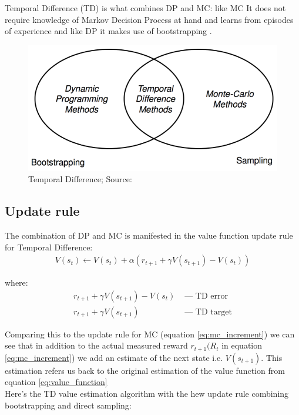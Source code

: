Temporal Difference (TD) is what combines DP and MC: like MC It does not require knowledge of Markov Decision Process at hand and 
learns from episodes of experience and like DP it makes use of bootstrapping \cite{lecture_mfl}.

\begin{figure}[h!]
  \centering
  \includegraphics[scale=0.5]{figures/TD_diagrams.PNG}
  \caption{Temporal Difference; Source: \cite{lecture_mfl}}
  \label{fig:td}
\end{figure}

\subsection{Update rule}
The combination of DP and MC is manifested in the value function update rule for Temporal Difference:
\begin{align}
  V(s_t) \longleftarrow V(s_t) + \alpha (r_{t+1} + \gamma V(s_{t+1}) - V(s_t)) \label{eq:td_update}
\end{align}

where:
\begin{align*}
  r_{t+1} + \gamma V(s_{t+1}) - V(s_t) &\text{ — } \text{TD error}\\
  r_{t+1} + \gamma V(s_{t+1}) &\text { — } \text{TD target}
\end{align*}

Comparing this to the update rule for MC (equation \ref{eq:mc_increment}) we can see that in addition to the actual measured reward $r_{t+1} (R_{t}$ in equation \ref{eq:mc_increment}) we add an estimate of the next state i.e. $V(s_{t+1})$. This estimation refers us back to the original estimation of the value function from equation \ref{eq:value_function}\\

Here's the TD value estimation algorithm with the hew update rule combining bootstrapping and direct sampling:

